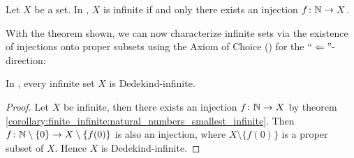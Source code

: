 \begin{corollary}\label{corollary:finite_infinite:natural_numbers_smallest_infinite}
    Let $X$ be a set. In , $X$ is infinite if and only there exists an injection $f\colon\mathbb{N}\to X$.
\end{corollary}

With the theorem shown, we can now characterize infinite sets via the existence of injections onto proper subsets using the Axiom of Choice () for the \enquote{$\Leftarrow$}-direction:

\begin{theorem}\label{theorem:finite_infinite:infinite_is_dedekind_infinite}
    In , every infinite set $X$ is Dedekind-infinite.
\end{theorem}

\begin{proof}
    Let $X$ be infinite, then there exists an injection $f\colon\mathbb{N}\to X$ by theorem \ref{corollary:finite_infinite:natural_numbers_smallest_infinite}. Then $f\colon\mathbb{N}\setminus\{0\}\to X\setminus\{f(0)\}$ is also an injection, where $X\setminus\{f(0)\}$ is a proper subset of $X$. Hence $X$ is Dedekind-infinite.
\end{proof}




